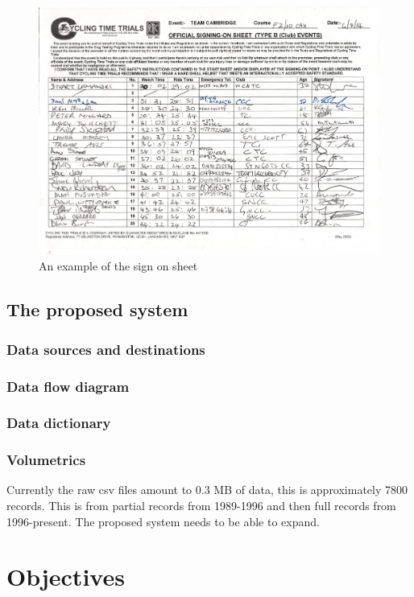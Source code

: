 \begin{figure}[H]
    \includegraphics[width=\textwidth]{./SignOnTimeKeepersSheet.pdf}
    \caption{An example of the sign on sheet} \label{fig:Sign on Sheet}
\end{figure}
\subsection{The proposed system}

\subsubsection{Data sources and destinations}

\subsubsection{Data flow diagram}

\subsubsection{Data dictionary}

\subsubsection{Volumetrics}
Currently the raw csv files amount to 0.3 MB of data, this is approximately 7800 records. This is from partial records from 1989-1996 and then full records from 1996-present. The proposed system needs to be able to expand.
\section{Objectives}

